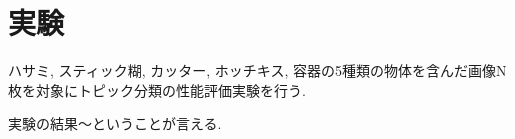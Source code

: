 \section{実験}
ハサミ, スティック糊, カッター, ホッチキス, 容器の5種類の物体を含んだ画像N枚を対象にトピック分類の性能評価実験を行う.
\par
実験の結果～ということが言える.

